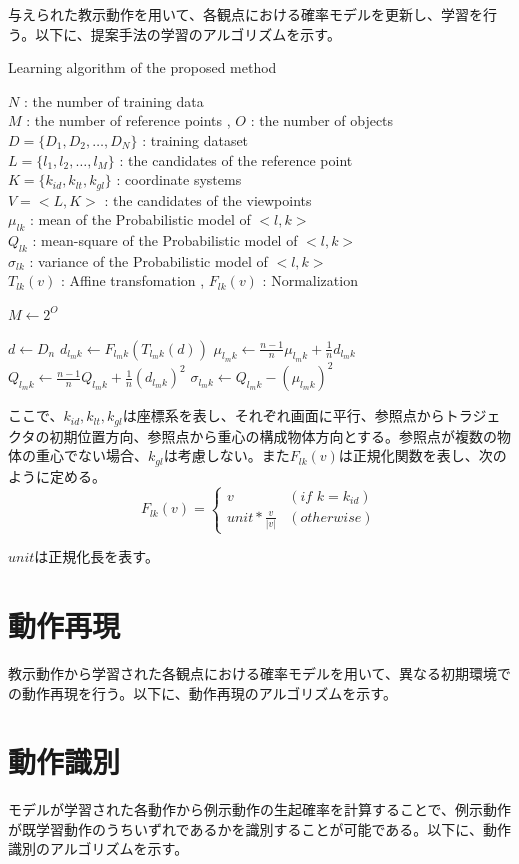 与えられた教示動作を用いて、各観点における確率モデルを更新し、学習を行う。以下に、提案手法の学習のアルゴリズムを示す。
	\begin{algorithm}[h]
		\caption{ Learning algorithm of the proposed method}
		\begin{algorithmic}
			\REQUIRE
				$N$ : the number of training data \\
				$M$ : the number of reference points , 
				$O$ : the number of objects \\
				$D = \{D_{1} , D_{2} , \ldots , D_{N}\}$ : training dataset \\
				$L = \{l_{1} , l_{2} , \ldots , l_{M}\}$ : the candidates of the reference point \\
				$K = \{k_{id} , k_{lt} , k_{gl}\}$ : coordinate systems \\
				$V = <L , K>$ : the candidates of the viewpoints \\
				$μ_{lk}$ : mean of the Probabilistic model of $<l , k>$ \\
				$Q_{lk}$ : mean-square of the Probabilistic model of $<l , k>$ \\
				$σ_{lk}$ : variance of the Probabilistic model of $<l , k>$ \\
				$T_{lk}(v)$ : Affine transfomation , 
				$F_{lk}(v)$ : Normalization
		\end{algorithmic}
		\begin{algorithmic}[1]
			\STATE$M \leftarrow 2^{O}$
			
			\FOR{$n=1$ to $N$}
				\STATE $d \leftarrow D_{n}$
				\FOR{$m=1$ to $M$}
					\FOR{all $k ∈K$}
						\STATE $d_{l_{m}k} \leftarrow F_{l_{m}k}(T_{l_{m}k}(d))$
						\STATE $μ_{l_{m}k} \leftarrow \frac{n-1}{n}μ_{l_{m}k} + \frac{1}{n}d_{l_{m}k}$
						\STATE $Q_{l_{m}k} \leftarrow \frac{n-1}{n}Q_{l_{m}k} + \frac{1}{n}(d_{l_{m}k})^2$
						\STATE $σ_{l_{m}k} \leftarrow Q_{l_{m}k} - (μ_{l_{m}k})^2$
					\ENDFOR
				\ENDFOR
			\ENDFOR
		\end{algorithmic}
	\end{algorithm}
ここで、$k_{id} , k_{lt} , k_{gl}$は座標系を表し、それぞれ画面に平行、参照点からトラジェクタの初期位置方向、参照点から重心の構成物体方向とする。参照点が複数の物体の重心でない場合、$k_{gl}$は考慮しない。また$F_{lk}(v)$は正規化関数を表し、次のように定める。
\[
	F_{lk}(v) = 
	\begin{cases}
		v & (if\,\,k=k_{id}) \\
		unit * \frac{v}{|v|} & (otherwise)
	\end{cases}
\]

$unit$は正規化長を表す。

\section{動作再現}

教示動作から学習された各観点における確率モデルを用いて、異なる初期環境での動作再現を行う。以下に、動作再現のアルゴリズムを示す。

\section{動作識別}

モデルが学習された各動作から例示動作の生起確率を計算することで、例示動作が既学習動作のうちいずれであるかを識別することが可能である。以下に、動作識別のアルゴリズムを示す。
